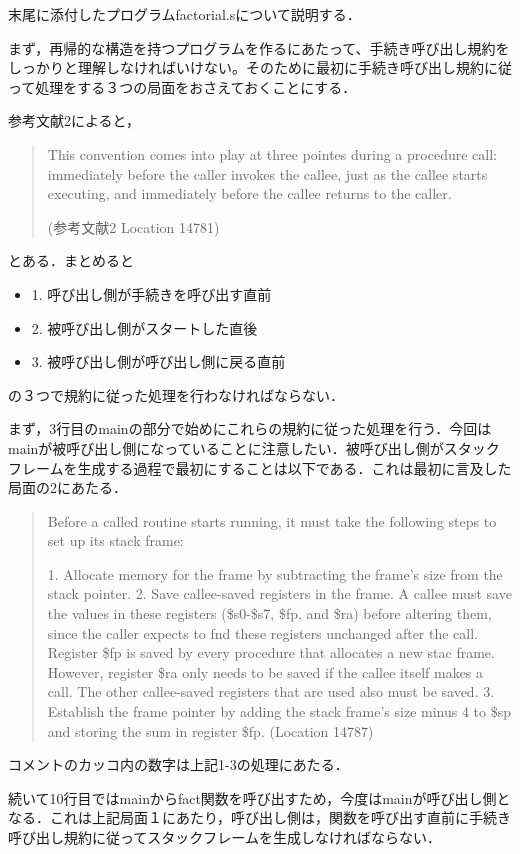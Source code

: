 \documentclass[a4j]{jarticle}
\begin{document}
末尾に添付したプログラムfactorial.sについて説明する．

まず，再帰的な構造を持つプログラムを作るにあたって、手続き呼び出し規約をしっかりと理解しなければいけない。そのために最初に手続き呼び出し規約に従って処理をする３つの局面をおさえておくことにする．

参考文献2によると，

\begin{quote}
This convention comes into play at three pointes during a procedure call: immediately before the caller invokes the callee, just as the callee starts executing, and immediately before the callee returns to the caller.

(参考文献2 Location 14781)
\end{quote}

とある．まとめると

\begin{itemize}
\item1. 呼び出し側が手続きを呼び出す直前
\item2. 被呼び出し側がスタートした直後
\item3. 被呼び出し側が呼び出し側に戻る直前
\end{itemize}

の３つで規約に従った処理を行わなければならない．

まず，3行目のmainの部分で始めにこれらの規約に従った処理を行う．今回はmainが被呼び出し側になっていることに注意したい．被呼び出し側がスタックフレームを生成する過程で最初にすることは以下である．これは最初に言及した局面の2にあたる．

\begin{quote}
Before a called routine starts running, it must take the following steps to set up its stack frame:

1. Allocate memory for the frame by subtracting the frame's size from the stack pointer.
2. Save callee-saved registers in the frame. A callee must save the values in these registers (\$s0-\$s7, \$fp, and \$ra) before altering them, since the caller expects to fnd these registers unchanged after the call. Register \$fp is saved by every procedure that allocates a new stac frame. However, register \$ra only needs to be saved if the callee itself makes a call. The other callee-saved registers that are used also must be saved.
3. Establish the frame pointer by adding the stack frame's size minus 4 to \$sp and storing the sum in register \$fp.
(Location 14787)
\end{quote}

コメントのカッコ内の数字は上記1-3の処理にあたる．

続いて10行目ではmainからfact関数を呼び出すため，今度はmainが呼び出し側となる．これは上記局面１にあたり，呼び出し側は，関数を呼び出す直前に手続き呼び出し規約に従ってスタックフレームを生成しなければならない．
\end{document}
